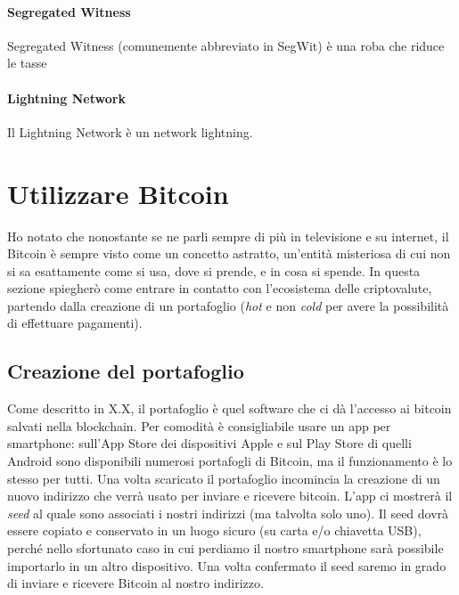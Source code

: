 \documentclass {article}
\begin{document}
\paragraph {Segregated Witness}

Segregated Witness (comunemente abbreviato in SegWit) è una roba che riduce le tasse

\paragraph {Lightning Network}

Il Lightning Network è un network lightning.

\newpage


\section {Utilizzare Bitcoin}


Ho notato che nonostante se ne parli sempre di più in televisione e su internet, il Bitcoin è sempre visto come un concetto astratto, un'entità misteriosa di cui non si sa esattamente come si usa, dove si prende, e in cosa si spende.
In questa sezione spiegherò come entrare in contatto con l'ecosistema delle criptovalute, partendo dalla creazione di un portafoglio (\textit{hot} e non \textit{cold} per avere la possibilità di effettuare pagamenti).


\subsection {Creazione del portafoglio}


Come descritto in X.X, il portafoglio è quel software che ci dà l'accesso ai bitcoin salvati nella blockchain.
Per comodità è consigliabile usare un app per smartphone: sull'App Store dei dispositivi Apple e sul Play Store di quelli Android sono disponibili numerosi portafogli di Bitcoin, ma il funzionamento è lo stesso per tutti.
Una volta scaricato il portafoglio incomincia la creazione di un nuovo indirizzo che verrà usato per inviare e ricevere bitcoin.
L'app ci mostrerà il \textit{seed} al quale sono associati i nostri indirizzi (ma talvolta solo uno).
Il seed dovrà essere copiato e conservato in un luogo sicuro (su carta e/o chiavetta USB), perché nello sfortunato caso in cui perdiamo il nostro smartphone sarà possibile importarlo in un altro dispositivo.
Una volta confermato il seed saremo in grado di inviare e ricevere Bitcoin al nostro indirizzo.
\end{document}
